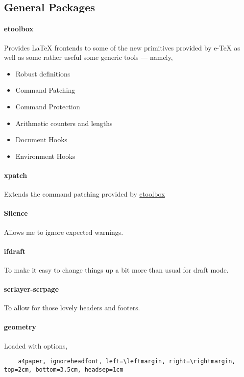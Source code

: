 \documentclass[solid,math,chem,code,plot]{bmc}
\begin{document}
\subsection{General Packages}

\paragraph{\ttfamily etoolbox}\label{par:etoolbox}
Provides LaTeX frontends to some of the new primitives provided by e-TeX
as well as some rather useful some generic tools --- namely,
\begin{itemize}
    \item Robust definitions
    \item Command Patching
    \item Command Protection
    \item Arithmetic counters and lengths
    \item Document Hooks
    \item Environment Hooks
\end{itemize}
\paragraph{\ttfamily xpatch}\label{par:xpatch}
Extends the command patching provided by \hyperref[par:etoolbox]{etoolbox}
\paragraph{\ttfamily Silence}\label{par:Silence}
Allows me to ignore expected warnings.
\paragraph{\ttfamily ifdraft}\label{par:ifdraft}
To make it easy to change things up a bit more than usual for draft mode.
\paragraph{\ttfamily scrlayer-scrpage}\label{par:scrlayer-scrpage}
To allow for those lovely headers and footers.
\paragraph{\ttfamily geometry}\label{par:geometry}
Loaded with options,
\begin{verbatim}
    a4paper, ignoreheadfoot, left=\leftmargin, right=\rightmargin, top=2cm, bottom=3.5cm, headsep=1cm
\end{verbatim}
\end{document}
